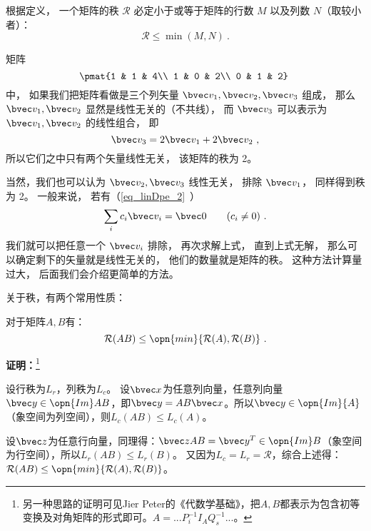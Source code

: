\begin{theorem}{}
根据定义， 一个矩阵的秩 $\mathcal R$ 必定小于或等于矩阵的行数 $M$ 以及列数 $N$（取较小者）：
\begin{equation}
\mathcal R\leq \min (M, N)~.
\end{equation}
\end{theorem}

\begin{example}{}
矩阵
\begin{equation}\label{eq_MatRnk_1}
\pmat{1 & 1 & 4\\ 1 & 0 & 2\\ 0 & 1 & 2}~
\end{equation}
中， 如果我们把矩阵看做是三个列矢量 $\bvec v_1, \bvec v_2, \bvec v_3$ 组成， 那么 $\bvec v_1, \bvec v_2$ 显然是线性无关的（不共线）， 而 $\bvec v_3$ 可以表示为 $\bvec v_1, \bvec v_2$ 的线性组合， 即
\begin{equation}
\bvec v_3 = 2\bvec v_1 + 2\bvec v_2~,
\end{equation}
所以它们之中只有两个矢量线性无关， 该矩阵的秩为 2。

当然，我们也可以认为 $\bvec v_2, \bvec v_3$ 线性无关， 排除 $\bvec v_1$， 同样得到秩为 2。 一般来说， 若有（\autoref{eq_linDpe_2}~）
\begin{equation}
\sum_i c_i \bvec v_i = \bvec 0 \qquad (c_i \ne 0)~.
\end{equation}
我们就可以把任意一个 $\bvec v_i$ 排除， 再次求解上式， 直到上式无解， 那么可以确定剩下的矢量就是线性无关的， 他们的数量就是矩阵的秩。 这种方法计算量过大， 后面我们会介绍更简单的方法。
\end{example}
关于秩，有两个常用性质：
\begin{theorem}{}
对于矩阵$A,B$有：
\begin{equation}
\mathcal R(AB)\le\opn{min}\{\mathcal R(A),\mathcal R(B)\}~.
\end{equation}
\end{theorem}
\textbf{证明：}\footnote{另一种思路的证明可见Jier Peter的《代数学基础》，把$A,B$都表示为包含初等变换及对角矩阵的形式即可。$A=...P^{-1}_iI_AQ^{-1}_s...$。}

设行秩为$L_r$，列秩为$L_c$。
设$\bvec x$为任意列向量，任意列向量$\bvec y\in \opn{Im}AB$，即$\bvec y=AB\bvec x$。所以$\bvec y\in \opn{Im}{A}$（象空间为列空间），则$ L_c(AB)\leq L_c(A)$。

设$\bvec z$为任意行向量，同理得：$\bvec z AB=\bvec y^T\in \opn {Im}B$（象空间为行空间），所以$L_r(AB)\leq L_r(B)$。
又因为$L_c=L_r=\mathcal R$，综合上述得：$\mathcal R(AB)\le\opn{min}\{\mathcal R(A),\mathcal R(B)\}$。

